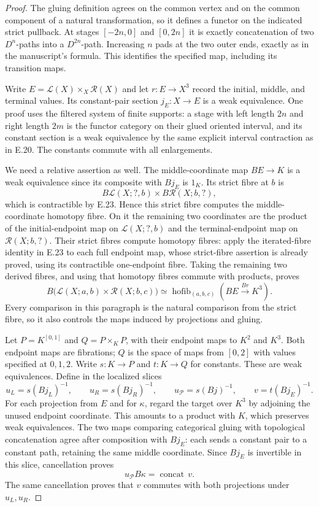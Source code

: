 \begin{proof}
The gluing definition agrees on the common vertex and on the common component of a natural transformation, so it defines a functor on the indicated strict pullback. At stages $[-2n,0]$ and $[0,2n]$ it is exactly concatenation of two $D^n$-paths into a $D^{2n}$-path. Increasing $n$ pads at the two outer ends, exactly as in the manuscript's formula. This identifies the specified map, including its transition maps.

Write $E=\mathcal L(X)\times_X\mathcal R(X)$ and let $r:E\to X^3$ record the initial, middle, and terminal values. Its constant-pair section $j_E:X\to E$ is a weak equivalence. One proof uses the filtered system of finite supports: a stage with left length $2n$ and right length $2m$ is the functor category on their glued oriented interval, and its constant section is a weak equivalence by the same explicit interval contraction as in E.20. The constants commute with all enlargements.

We need a relative assertion as well. The middle-coordinate map $BE\to K$ is a weak equivalence since its composite with $Bj_E$ is $1_K$. Its strict fibre at $b$ is
\[
 B\mathcal L(X;?,b)\times B\mathcal R(X;b,?),
\]
which is contractible by E.23. Hence this strict fibre computes the middle-coordinate homotopy fibre. On it the remaining two coordinates are the product of the initial-endpoint map on $\mathcal L(X;?,b)$ and the terminal-endpoint map on $\mathcal R(X;b,?)$. Their strict fibres compute homotopy fibres: apply the iterated-fibre identity in E.23 to each full endpoint map, whose strict-fibre assertion is already proved, using its contractible one-endpoint fibre. Taking the remaining two derived fibres, and using that homotopy fibres commute with products, proves
\[
 B\bigl(\mathcal L(X;a,b)\times\mathcal R(X;b,c)\bigr)
       \simeq \operatorname{hofib}_{(a,b,c)}(BE\xrightarrow{Br}K^3).
\]
Every comparison in this paragraph is the natural comparison from the strict fibre, so it also controls the maps induced by projections and gluing.

Let $P=K^{[0,1]}$ and $Q=P\times_K P$, with their endpoint maps to $K^2$ and $K^3$. Both endpoint maps are fibrations; $Q$ is the space of maps from $[0,2]$ with values specified at $0,1,2$. Write $s:K\to P$ and $t:K\to Q$ for constants. These are weak equivalences. Define in the localized slices
\[
 u_L=s(Bj_L)^{-1},\qquad u_R=s(Bj_R)^{-1},\qquad
 u_{\mathcal P}=s(Bj)^{-1},\qquad v=t(Bj_E)^{-1}.
\]
For each projection from $E$ and for $\kappa$, regard the target over $K^3$ by adjoining the unused endpoint coordinate. This amounts to a product with $K$, which preserves weak equivalences. The two maps comparing categorical gluing with topological concatenation agree after composition with $Bj_E$: each sends a constant pair to a constant path, retaining the same middle coordinate. Since $Bj_E$ is invertible in this slice, cancellation proves
\[
                  u_{\mathcal P}B\kappa
                       =\operatorname{concat}\,v.
\]
The same cancellation proves that $v$ commutes with both projections under $u_L,u_R$.


\end{proof}
